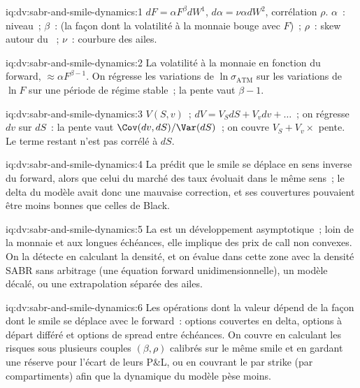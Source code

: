 \begin{solution}{iq:dv:sabr-and-smile-dynamics:1}
$dF=\alpha F^\beta dW^1$, $d\alpha=\nu\alpha dW^2$, corrélation $\rho$. $\alpha$~: niveau~; $\beta$~:  (la façon dont la volatilité
à la monnaie bouge avec $F$)~; $\rho$~: skew autour du ~; $\nu$~: courbure des ailes.
\end{solution}

\begin{solution}{iq:dv:sabr-and-smile-dynamics:2}
La volatilité à la monnaie en fonction du forward, $\approx\alpha F^{\beta-1}$. On régresse les variations de
$\ln\sigma_{\mathrm{ATM}}$ sur les variations de $\ln F$ sur une période de régime stable~; la pente vaut $\beta-1$.
\end{solution}

\begin{solution}{iq:dv:sabr-and-smile-dynamics:3}
$V(S,v)$~; $dV=V_SdS+V_vdv+\dots$~; on régresse $dv$ sur $dS$~: la pente vaut $\Cov(dv,dS)/\Var(dS)$~; on couvre $V_S+V_v\times$ pente. Le
terme restant n'est pas corrélé à $dS$.
\end{solution}

\begin{solution}{iq:dv:sabr-and-smile-dynamics:4}
La  prédit que le smile se déplace en sens inverse du forward, alors que celui du marché des taux évoluait dans le même sens~;
le delta du modèle avait donc une mauvaise correction, et ses couvertures pouvaient être moins bonnes que celles de Black.
\end{solution}

\begin{solution}{iq:dv:sabr-and-smile-dynamics:5}
La  est un développement asymptotique~; loin de la monnaie et aux longues échéances, elle implique des prix de call non convexes.
On la détecte en calculant la densité, et on évalue dans cette zone avec la densité SABR sans arbitrage (une équation forward unidimensionnelle),
un modèle décalé, ou une extrapolation séparée des ailes.
\end{solution}

\begin{solution}{iq:dv:sabr-and-smile-dynamics:6}
Les opérations dont la valeur dépend de la façon dont le smile se déplace avec le forward~: options couvertes en delta, options à départ différé
et options de spread entre échéances. On couvre en calculant les risques sous plusieurs couples $(\beta,\rho)$ calibrés sur le même smile
et en gardant une réserve pour l'écart de leurs P\&L, ou en couvrant le  par strike (par compartiments) afin que la dynamique du modèle
pèse moins.
\end{solution}
